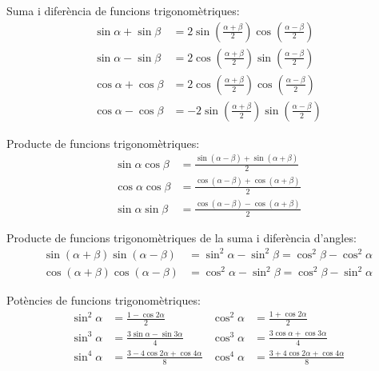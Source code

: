 Suma i diferència de funcions trigonomètriques:
\begin{subequations}
\begin{align}
    \sin\alpha+\sin\beta &= 2 \sin\left(\frac{\alpha+\beta}{2}\right)
    \cos\left(\frac{\alpha-\beta}{2}\right)\\[1ex]
    \sin\alpha-\sin\beta &= 2 \cos\left(\frac{\alpha+\beta}{2}\right)
    \sin\left(\frac{\alpha-\beta}{2}\right)\\[1ex]
    \cos\alpha+\cos\beta &= 2 \cos\left(\frac{\alpha+\beta}{2}\right)
    \cos\left(\frac{\alpha-\beta}{2}\right)\\[1ex]
    \cos\alpha-\cos\beta &= -2 \sin\left(\frac{\alpha+\beta}{2}\right)
    \sin\left(\frac{\alpha-\beta}{2}\right)
\end{align}
\end{subequations}

Producte de funcions trigonomètriques:
\begin{subequations}
\begin{align}
    \sin\alpha \cos\beta &=
    \frac{\sin(\alpha-\beta)+\sin(\alpha+\beta)}{2}\\[1ex]
    \cos\alpha \cos\beta &=
    \frac{\cos(\alpha-\beta)+\cos(\alpha+\beta)}{2}\label{eq:cos-cos}\\[1ex]
    \sin\alpha \sin\beta &=
    \frac{\cos(\alpha-\beta)-\cos(\alpha+\beta)}{2}
\end{align}
\end{subequations}

Producte de funcions trigonomètriques de la suma i diferència
d'angles:
\begin{subequations}
\begin{align}
    \sin(\alpha+\beta) \sin(\alpha-\beta) &= \sin^2\alpha-\sin^2\beta =
    \cos^2\beta - \cos^2\alpha\\[1ex]
    \cos(\alpha+\beta) \cos(\alpha-\beta) &= \cos^2\alpha-\sin^2\beta =
    \cos^2\beta - \sin^2\alpha
\end{align}
\end{subequations}

Potències de funcions trigonomètriques:
\begin{subequations}
\begin{align}
    \sin^2\alpha &= \frac{1-\cos 2\alpha}{2} &  \cos^2\alpha &= \frac{1+\cos 2\alpha}{2}\\[1ex]
    \sin^3\alpha &= \frac{3\sin\alpha-\sin 3\alpha}{4} &  \cos^3\alpha &= \frac{3\cos\alpha+\cos 3\alpha}{4}\\[1ex]
    \sin^4\alpha &= \frac{3-4\cos 2\alpha+\cos 4\alpha}{8} &  \cos^4\alpha &= \frac{3+4\cos 2\alpha+\cos 4\alpha}{8}
\end{align}
\end{subequations}

